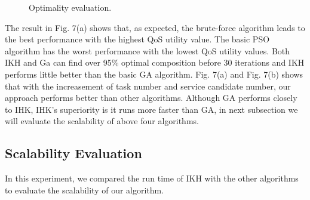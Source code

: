 \documentclass[10pt,journal,compsoc]{IEEEtran}
\begin{document}
\begin{figure}[!t]
\centering
{}
\hfil
{}
\hfil
{}

\caption{Optimality evaluation.} \label{fig_sim}
\end{figure}

The result in Fig. 7(a) shows that, as expected, the brute-force algorithm leads to the best performance with the highest QoS utility value. The basic PSO algorithm has the worst performance with the lowest QoS utility values. Both IKH and Ga can find over 95\% optimal composition before 30 iterations and IKH performs little better than the basic GA algorithm. 
Fig. 7(a) and Fig. 7(b) shows that with the increasement of task number and service candidate number, our approach performs better than other algorithms.
Although GA performs closely to IHK, IHK's superiority is it runs more faster than GA, in next subsection we will evaluate the scalability of above four algorithms.

\subsection{Scalability Evaluation}
In this experiment, we compared the run time of IKH with the other algorithms to evaluate the scalability of our algorithm.
\end{document}
